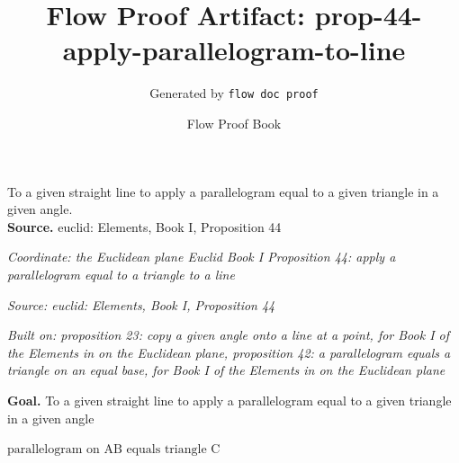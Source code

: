 \documentclass[11pt]{article}
\title{Flow Proof Artifact: prop-44-apply-parallelogram-to-line}
\author{Generated by \texttt{flow doc proof}}
\date{Flow Proof Book}
\theoremstyle{definition}
\begin{document}
\maketitle
To a given straight line to apply a parallelogram equal to a given triangle in a given angle.\\[0.5em]
\textbf{Source.} euclid: Elements, Book I, Proposition 44\\[0.5em]
\bigskip
{}\par
\smallskip\noindent\textit{Coordinate: the Euclidean plane \cdot Euclid Book I \cdot Proposition 44: apply a parallelogram equal to a triangle to a line}\par
\smallskip\noindent\textit{Source: euclid: Elements, Book I, Proposition 44}\par
\smallskip\noindent\textit{Built on: proposition 23: copy a given angle onto a line at a point, for Book I of the Elements in on the Euclidean plane, proposition 42: a parallelogram equals a triangle on an equal base, for Book I of the Elements in on the Euclidean plane}\par
\medskip
\noindent\textbf{Goal.} To a given straight line to apply a parallelogram equal to a given triangle in a given angle\par
\noindent$\displaystyle \text{parallelogram on AB equals triangle C}$\par
\medskip
\noindent
\end{document}
